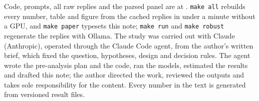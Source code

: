 Code, prompts, all raw replies and the parsed panel are at \repo{}. \texttt{make all} rebuilds every number, table and figure from the cached replies in under a minute without a GPU, and \texttt{make paper} typesets this note; \texttt{make run} and \texttt{make robust} regenerate the replies with Ollama. The study was carried out with Claude (Anthropic), operated through the Claude Code agent, from the author's written brief, which fixed the question, hypotheses, design and decision rules. The agent wrote the pre-analysis plan and the code, ran the models, estimated the results and drafted this note; the author directed the work, reviewed the outputs and takes sole responsibility for the content. Every number in the text is generated from versioned result files.

